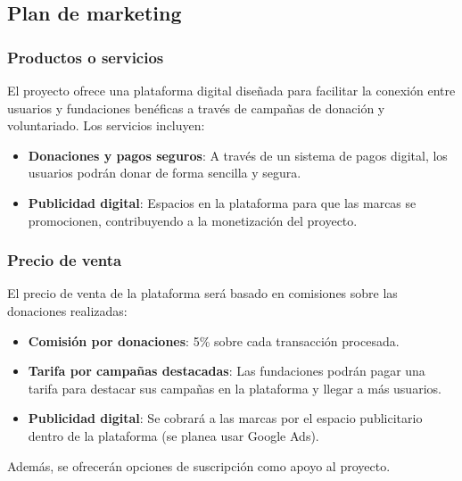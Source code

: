 \documentclass[a4paper,12pt]{article}
\begin{document}
\subsection{Plan de marketing}

\subsubsection{Productos o servicios}
El proyecto ofrece una plataforma digital diseñada para facilitar la conexión entre usuarios y fundaciones benéficas a través de campañas de donación y voluntariado. Los servicios incluyen:
\begin{itemize}
    \item \textbf{Donaciones y pagos seguros}: A través de un sistema de pagos digital, los usuarios podrán donar de forma sencilla y segura.
    \item \textbf{Publicidad digital}: Espacios en la plataforma para que las marcas se promocionen, contribuyendo a la monetización del proyecto.
\end{itemize}

\subsubsection{Precio de venta}
El precio de venta de la plataforma será basado en comisiones sobre las donaciones realizadas:
\begin{itemize}
    \item \textbf{Comisión por donaciones}: 5\% sobre cada transacción procesada.
    \item \textbf{Tarifa por campañas destacadas}: Las fundaciones podrán pagar una tarifa para destacar sus campañas en la plataforma y llegar a más usuarios.
    \item \textbf{Publicidad digital}: Se cobrará a las marcas por el espacio publicitario dentro de la plataforma (se planea usar Google Ads).
\end{itemize}
Además, se ofrecerán opciones de suscripción como apoyo al proyecto.
\end{document}
